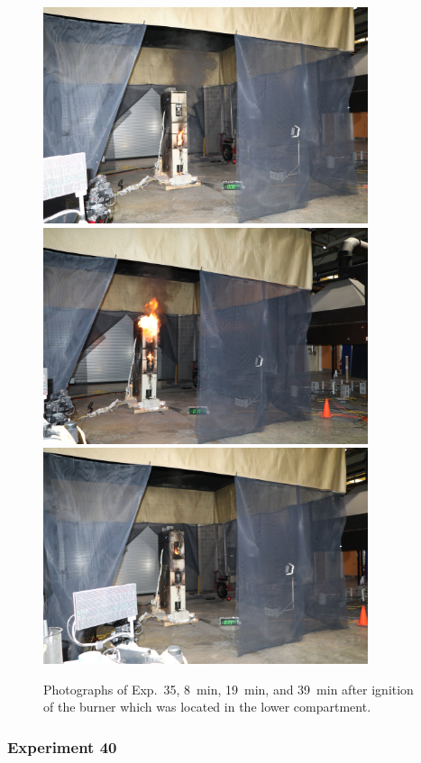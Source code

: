 \begin{figure}[p]
\centering
\includegraphics[height=2.50in]{../FIGURES/Test_35_8_min} \\
\includegraphics[height=2.50in]{../FIGURES/Test_35_19_min} \\
\includegraphics[height=2.50in]{../FIGURES/Test_35_39_min}
\caption[Photographs of Exp.~35]{Photographs of Exp.~35, 8~min, 19~min, and 39~min after ignition of the burner which was located in the lower compartment.}
\label{fig:Test_35_photos}
\end{figure}


\clearpage

\subsubsection{Experiment 40}

